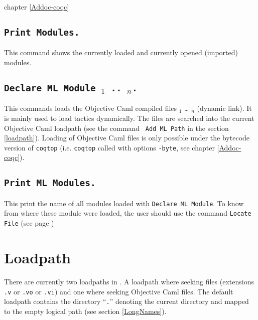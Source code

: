 \SeeAlso chapter \ref{Addoc-coqc}

\subsection[\tt Print Modules.]{\tt Print Modules.}
This command shows the currently loaded and currently opened
(imported) modules.

\subsection[\tt Declare ML Module {\str$_1$} .. {\str$_n$}.]{\tt Declare ML Module {\str$_1$} .. {\str$_n$}.}
This commands loads the Objective Caml compiled files {\str$_1$} \dots
{\str$_n$} (dynamic link). It is mainly used to load tactics
dynamically.
 The files are
searched into the current Objective Caml loadpath (see the command {\tt
Add ML Path} in the section \ref{loadpath}).  Loading of Objective Caml
files is only possible under the bytecode version of {\tt coqtop}
(i.e. {\tt coqtop} called with options {\tt -byte}, see chapter 
\ref{Addoc-coqc}).

\begin{ErrMsgs}
\item {}
\item {}
\end{ErrMsgs}

\subsection[\tt Print ML Modules.]{\tt Print ML Modules.}
This print the name of all \ocaml{} modules loaded with \texttt{Declare
  ML Module}. To know from where these module were loaded, the user
should use the command \texttt{Locate File} (see page \pageref{Locate File})

\section[Loadpath]{Loadpath\label{loadpath}}

There are currently two loadpaths in \Coq. A loadpath where seeking
{\Coq} files (extensions {\tt .v} or {\tt .vo} or {\tt .vi}) and one where
seeking Objective Caml files. The default loadpath contains the
directory ``\texttt{.}'' denoting the current directory and mapped to the empty logical path (see section \ref{LongNames}).

